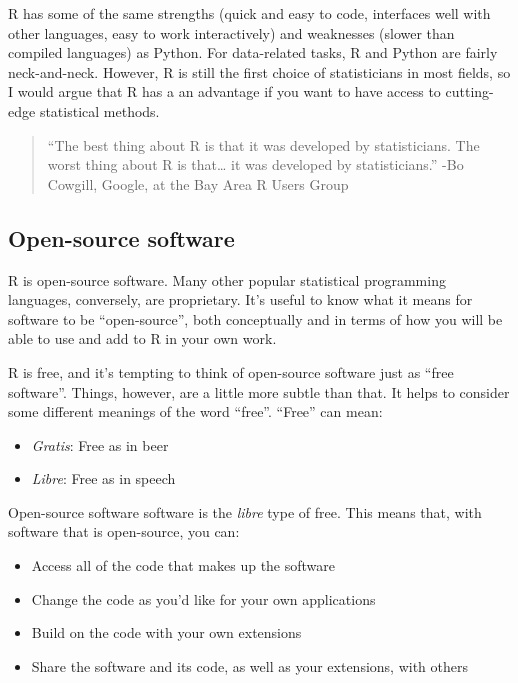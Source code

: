 \documentclass[]{book}
\providecommand{\tightlist}{%
  \setlength{\itemsep}{0pt}\setlength{\parskip}{0pt}}
\theoremstyle{definition}
\theoremstyle{definition}
\theoremstyle{definition}
\theoremstyle{remark}
\begin{document}
R has some of the same strengths (quick and easy to code, interfaces
well with other languages, easy to work interactively) and weaknesses
(slower than compiled languages) as Python. For data-related tasks, R
and Python are fairly neck-and-neck. However, R is still the first
choice of statisticians in most fields, so I would argue that R has a an
advantage if you want to have access to cutting-edge statistical
methods.

\begin{quote}
``The best thing about R is that it was developed by statisticians. The
worst thing about R is that\ldots{} it was developed by statisticians.''
-Bo Cowgill, Google, at the Bay Area R Users Group
\end{quote}

\subsection{Open-source software}\label{open-source-software}

R is open-source software. Many other popular statistical programming
languages, conversely, are proprietary. It's useful to know what it
means for software to be ``open-source'', both conceptually and in terms
of how you will be able to use and add to R in your own work.

R is free, and it's tempting to think of open-source software just as
``free software''. Things, however, are a little more subtle than that.
It helps to consider some different meanings of the word ``free''.
``Free'' can mean:

\begin{itemize}
\tightlist
\item
  \emph{Gratis}: Free as in beer
\item
  \emph{Libre}: Free as in speech
\end{itemize}

Open-source software software is the \emph{libre} type of free. This
means that, with software that is open-source, you can:

\begin{itemize}
\tightlist
\item
  Access all of the code that makes up the software
\item
  Change the code as you'd like for your own applications
\item
  Build on the code with your own extensions
\item
  Share the software and its code, as well as your extensions, with
  others
\end{itemize}
\end{document}
